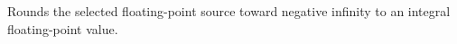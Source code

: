 Rounds the selected floating-point source toward negative infinity to an integral floating-point value.
